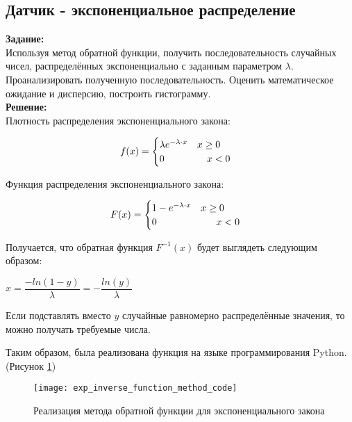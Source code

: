 \subsection*{Датчик - экспоненциальное распределение}

\textbf{Задание:}\\
Используя метод обратной функции, получить последовательность случайных чисел, распределённых экспоненциально с заданным параметром $\lambda$. Проанализировать полученную последовательность. Оценить математическое ожидание  и дисперсию, построить гистограмму.\\

\textbf{Решение:}\\
Плотность распределения экспоненциального закона:
\begin{ceqn}
	\begin{align*}
		f(x) =
		\begin{cases}
			\lambda e^{-\lambda \cdot x} \quad x \geq 0\\
			0 \hspace{1.55cm} x < 0
		\end{cases}
	\end{align*}
\end{ceqn}

Функция распределения экспоненциального закона:
\begin{ceqn}
	\begin{align*}
		F(x) =
		\begin{cases}
			1 - e^{-\lambda \cdot x} \quad x \geq 0\\
			0 \hspace{2.15cm} x < 0
		\end{cases}
	\end{align*}
\end{ceqn}

Получается, что обратная функция $F^{-1}(x)$ будет выглядеть следующим образом:
\begin{center}
	$x = \dfrac{-ln(1-y)}{\lambda} = -\dfrac{ln(y)}{\lambda}$
\end{center}
Если подставлять вместо $y$ случайные равномерно распределённые значения, то можно получать требуемые числа.

Таким образом, была реализована функция на языке программирования Python. (Рисунок \ref{fig:exp_inverse_function_method_code})
\begin{figure}[h]
	\centering \texttt{[image: exp\_inverse\_function\_method\_code]}
	\caption{Реализация метода обратной функции для экспоненциального закона}
	\label{fig:exp_inverse_function_method_code}
\end{figure}


